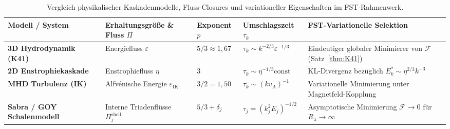 \documentclass[12pt,a4paper]{article}
\theoremstyle{breakdef}
\theoremstyle{breakplain}
\theoremstyle{breakdef}
\begin{document}
\begin{table}[htbp]
\centering
\footnotesize
\caption{Vergleich physikalischer Kaskadenmodelle, Fluss-Closures und variationeller Eigenschaften im FST-Rahmenwerk.}
\label{tab:closure-comparison}
\vspace{4pt}
\setlength{\tabcolsep}{3.5pt}
\renewcommand{\arraystretch}{1.15}
\begin{tabularx}{\textwidth}{>{\raggedright\arraybackslash}p{2.8cm} Y >{\centering\arraybackslash}p{1.7cm} >{\raggedright\arraybackslash}p{2.7cm} Y}
\toprule
\textbf{Modell / System} & \textbf{Erhaltungsgröße \& Fluss $\Pi$} & \textbf{Exponent $p$} & \textbf{Umschlagszeit $\tau_k$} & \textbf{FST-Variationelle Selektion} \\
\midrule
\textbf{3D Hydrodynamik (K41)} & Energiefluss $\varepsilon$ & $5/3 \approx 1{,}67$ & $\tau_k \sim k^{-2/3}\varepsilon^{-1/3}$ & Eindeutiger globaler Minimierer von $\mathcal{F}$ (Satz~\ref{thm:K41}) \\
\addlinespace[2pt]
\textbf{2D Enstrophiekaskade} & Enstrophiefluss $\eta$ & $3$ & $\tau_k \sim \eta^{-1/3} \mathrm{const}$ & KL-Divergenz bezüglich $E_k^* \sim \eta^{2/3} k^{-3}$ \\
\addlinespace[2pt]
\textbf{MHD Turbulenz (IK)} & Alfv\'enische Energie $\varepsilon_{\mathrm{IK}}$ & $3/2 = 1{,}50$ & $\tau_k \sim (k v_A)^{-1}$ & Variationelle Minimierung unter Magnetfeld-Kopplung \\
\addlinespace[2pt]
\textbf{Sabra / GOY Schalenmodell} & Interne Triadenflüsse $\Pi_j^{\mathrm{shell}}$ & $5/3 + \delta_j$ & $\tau_j = (k_j^2 E_j)^{-1/2}$ & Asymptotische Minimierung $\mathcal{F} \to 0$ für $R_\lambda \to \infty$ \\
\bottomrule
\end{tabularx}
\end{table}
\end{document}
